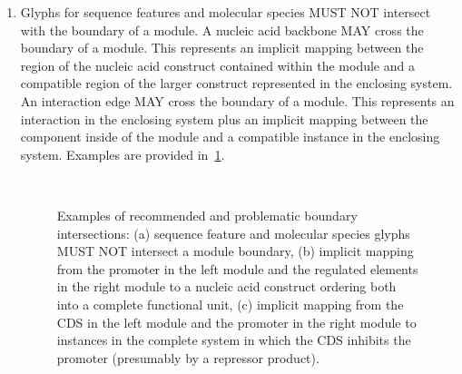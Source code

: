 \begin{enumerate}
\item Glyphs for sequence features and molecular species MUST NOT intersect with the boundary of a module.
	A nucleic acid backbone MAY cross the boundary of a module. This represents an implicit mapping between the region of the nucleic acid construct contained within the module and a compatible region of the larger construct represented in the enclosing system.
	An interaction edge MAY cross the boundary of a module. This represents an interaction in the enclosing system plus an implicit mapping between the component inside of the module and a compatible instance in the enclosing system.
	Examples are provided in~\ref{exa:moduleC}.

	\begin{figure}[h!]
	\centering
	\\
	\caption{Examples of recommended and problematic boundary intersections: (a) sequence feature and molecular species glyphs MUST NOT intersect a module boundary, (b) implicit mapping from the promoter in the left module and the regulated elements in the right module to a nucleic acid construct ordering both into a complete functional unit, (c) implicit mapping from the CDS in the left module and the promoter in the right module to instances in the complete system in which the CDS inhibits the promoter (presumably by a repressor product).}
	\label{exa:moduleC}
	\end{figure}



\end{enumerate}
